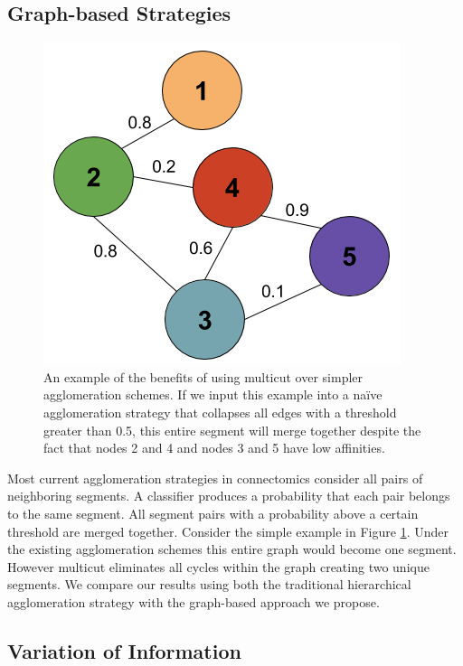 \subsection{Graph-based Strategies}

\begin{figure}
	\centering
	\includegraphics[width=0.8\linewidth]{./figures/multicut.png}
	\caption{An example of the benefits of using multicut over simpler agglomeration schemes. If we input this example into a na\"ive agglomeration strategy that collapses all edges with a threshold greater than 0.5, this entire segment will merge together despite the fact that nodes 2 and 4 and nodes 3 and 5 have low affinities.}
	\label{fig:multicut}
\end{figure}

Most current agglomeration strategies in connectomics consider all pairs of neighboring segments. A classifier produces a probability that each pair belongs to the same segment. All segment pairs with a probability above a certain threshold are merged together. Consider the simple example in Figure \ref{fig:multicut}. Under the existing agglomeration schemes this entire graph would become one segment. However multicut eliminates all cycles within the graph creating two unique segments. We compare our results using both the traditional hierarchical agglomeration strategy with the graph-based approach we propose. 

\subsection{Variation of Information}

